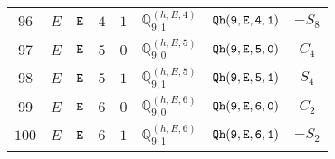 \documentclass[fleqn,8pt]{jsarticle}
\begin{document}
\begin{table}[ht!]
\begin{center}
\begin{tabular}{cccccccc}
$ 96 $ & $ E $ & $ {\tt E} $ & $ 4 $ & $ 1 $ & $ \mathbb{Q}_{9,1}^{(h,E,4)} $ & $ {\tt Qh(9,E,4,1)} $ & $ - S_{8} $ \\
$ 97 $ & $ E $ & $ {\tt E} $ & $ 5 $ & $ 0 $ & $ \mathbb{Q}_{9,0}^{(h,E,5)} $ & $ {\tt Qh(9,E,5,0)} $ & $ C_{4} $ \\
$ 98 $ & $ E $ & $ {\tt E} $ & $ 5 $ & $ 1 $ & $ \mathbb{Q}_{9,1}^{(h,E,5)} $ & $ {\tt Qh(9,E,5,1)} $ & $ S_{4} $ \\
$ 99 $ & $ E $ & $ {\tt E} $ & $ 6 $ & $ 0 $ & $ \mathbb{Q}_{9,0}^{(h,E,6)} $ & $ {\tt Qh(9,E,6,0)} $ & $ C_{2} $ \\
$ 100 $ & $ E $ & $ {\tt E} $ & $ 6 $ & $ 1 $ & $ \mathbb{Q}_{9,1}^{(h,E,6)} $ & $ {\tt Qh(9,E,6,1)} $ & $ - S_{2} $ \\
 \hline \hline
\end{tabular}
\end{center}
\end{table}
\end{document}
